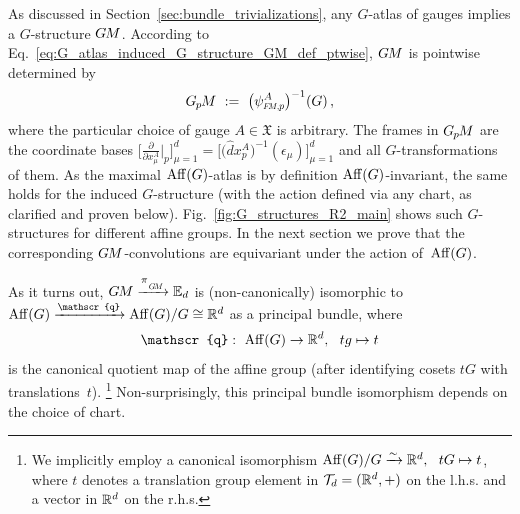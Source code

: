As discussed in Section~\ref{sec:bundle_trivializations}, any $G$-atlas of gauges implies a $G$-structure $G\mkern-1.4muM$.
According to Eq.~\eqref{eq:G_atlas_induced_G_structure_GM_def_ptwise}, $G\mkern-1.4muM$ is pointwise determined by
\begin{align}
    \GpM\ :=\ \big( \psiFMp^A \big)^{-1} (G) \,,
\end{align}
where the particular choice of gauge $A \in \mathfrak{X}$ is arbitrary.
The frames in $G_{\mkern-1.3mu p}\mkern-1.2muM$ are the coordinate bases 
$\big[ \frac{\partial}{\partial x^A_\mu} \big|_p \big]_{\mu=1}^d = \big[\big(\hat{d}x_p^A \big)^{-1} (\epsilon_\mu) \big]_{\mu=1}^d$
and all $G$-transformations of them.
As the maximal $\operatorname{Aff}(G)$-atlas is by definition $\operatorname{Aff}(G)$-invariant, the same holds for the induced $G$-structure (with the action defined via any chart, as clarified and proven below).
Fig.~\ref{fig:G_structures_R2_main} shows such $G$-structures for different affine groups.
In the next section we prove that the corresponding $G\mkern-1.4muM$-convolutions are equivariant under the action of~$\operatorname{Aff}(G)$.


As it turns out, $\GM \xrightarrow{\piGM} \Euc_d$ is (non-canonically) isomorphic to $\Aff(G) \xrightarrow{\mathscr{q}} \Aff(G)/G \cong \R^d$ as a principal bundle, where
\begin{align}
    \mathscr{q}:\ \Aff(G) \to \R^d,\ \ tg \mapsto t
\end{align}
is the canonical quotient map of the affine group (after identifying cosets $tG$ with translations~$t$).%
\footnote{
    We implicitly employ a canonical isomorphism $\operatorname{Aff}(G)/G \xrightarrow{\sim} \mathbb{R}^d,\ \ tG \mapsto t$, where $t$ denotes a translation group element in $\mathcal{T}_d = (\mathbb{R}^d,+)$ on the l.h.s. and a vector in $\mathbb{R}^d$ on the r.h.s.
}
Non-surprisingly, this principal bundle isomorphism depends on the choice of chart.

